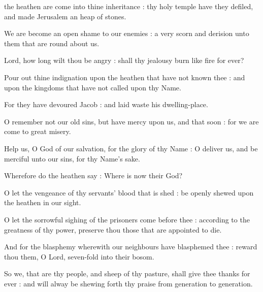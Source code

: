 

 the heathen are come into thine inheritance : thy holy temple have they defiled, and made Jerusalem an heap of stones.\par
{}
We are become an open shame to our enemies : a very scorn and derision unto them that are round about us.\par
{}Lord, how long wilt thou be angry : shall thy jealousy burn like fire for ever?\par
{}Pour out thine indignation upon the heathen that have not known thee : and upon the kingdoms that have not called upon thy Name.\par
{}For they have devoured Jacob : and laid waste his dwelling-place.\par
{}O remember not our old sins, but have mercy upon us, and that soon : for we are come to great misery.\par
{}Help us, O God of our salvation, for the glory of thy Name : O deliver us, and be merciful unto our sins, for thy Name's sake.\par
{}Wherefore do the heathen say : Where is now their God?\par
{}O let the vengeance of thy servants' blood that is shed : be openly shewed upon the heathen in our sight.\par
{}O let the sorrowful sighing of the prisoners come before thee : according to the greatness of thy power, preserve thou those that are appointed to die.\par
{}And for the blasphemy wherewith our neighbours have blasphemed thee : reward thou them, O Lord, seven-fold into their bosom.\par
{}So we, that are thy people, and sheep of thy pasture, shall give thee thanks for ever : and will alway be shewing forth thy praise from generation to generation.\par


